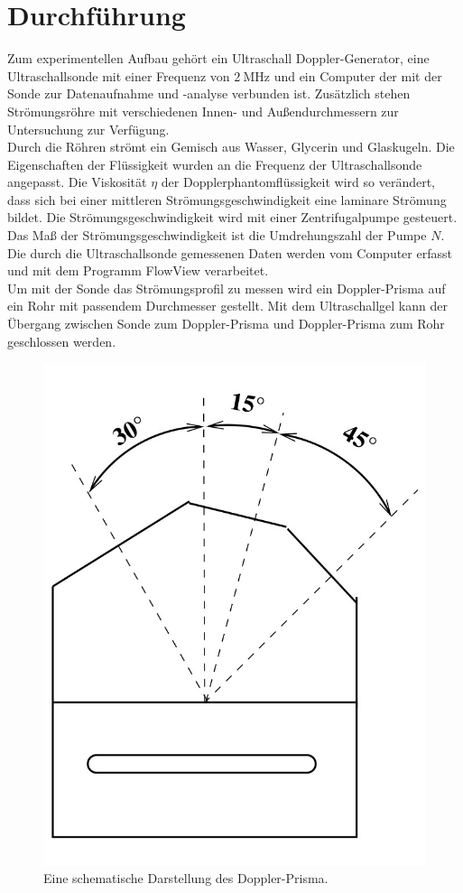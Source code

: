 \section{Durchführung}
\label{sec:Durchführung}
Zum experimentellen Aufbau gehört ein Ultraschall Doppler-Generator, eine Ultraschallsonde mit einer Frequenz von $\SI{2}{\mega\hertz}$ und ein Computer der mit der Sonde zur Datenaufnahme und -analyse verbunden ist.
Zusätzlich stehen Strömungsröhre mit verschiedenen Innen- und Außendurchmessern zur Untersuchung zur Verfügung.\\
Durch die Röhren strömt ein Gemisch aus Wasser, Glycerin und Glaskugeln.
Die Eigenschaften der Flüssigkeit wurden an die Frequenz der Ultraschallsonde angepasst.
Die Viskosität $\eta$ der Dopplerphantomflüssigkeit wird so verändert, dass sich bei einer mittleren Strömungsgeschwindigkeit eine laminare Strömung bildet.
Die Strömungsgeschwindigkeit wird mit einer Zentrifugalpumpe gesteuert.
Das Maß der Strömungsgeschwindigkeit ist die Umdrehungszahl der Pumpe $N$.\\
Die durch die Ultraschallsonde gemessenen Daten werden vom Computer erfasst und mit dem Programm FlowView verarbeitet.\\
Um mit der Sonde das Strömungsprofil zu messen wird ein Doppler-Prisma auf ein Rohr mit passendem Durchmesser gestellt.
Mit dem Ultraschallgel kann der Übergang zwischen Sonde zum Doppler-Prisma und Doppler-Prisma zum Rohr geschlossen werden.\\
\begin{figure}
    \centering
    \includegraphics[width=0.75\linewidth]{content/data/doppler_prisma.jpg}
    \caption{Eine schematische Darstellung des Doppler-Prisma. \cite[3]{anleitung}}
    \label{fig:doppler_prisma}
\end{figure}
